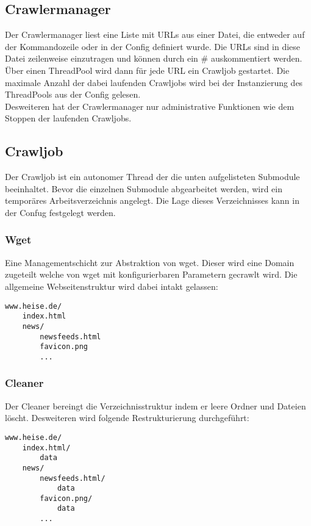 \subsection{Crawlermanager}
\label{sub:crawlermanager}
Der Crawlermanager liest eine Liste mit URLs aus einer Datei, die entweder auf der Kommandozeile oder in
der Config definiert wurde. Die URLs sind in diese Datei zeilenweise einzutragen und können durch ein \# auskommentiert werden.
Über einen ThreadPool wird dann für jede URL ein Crawljob gestartet. Die maximale Anzahl der dabei laufenden Crawljobs wird bei
der Instanzierung des ThreadPools aus der Config gelesen.
\\
Desweiteren hat der Crawlermanager nur administrative Funktionen wie dem Stoppen der laufenden Crawljobs.

\subsection{Crawljob}
\label{sub:crawljob}
Der Crawljob ist ein autonomer Thread der die unten aufgelisteten Submodule beeinhaltet.
Bevor die einzelnen Submodule abgearbeitet werden, wird ein temporäres Arbeitsverzeichnis angelegt.
Die Lage dieses Verzeichnisses kann in der Confug festgelegt werden.

\subsubsection{Wget}
\label{ssub:wget}
Eine Managementschicht zur Abstraktion von wget.
Dieser wird eine Domain zugeteilt welche von wget mit konfigurierbaren Parametern gecrawlt wird.
Die allgemeine Webseitenstruktur wird dabei intakt gelassen:

\begin{verbatim}
www.heise.de/
    index.html
    news/
        newsfeeds.html
        favicon.png
        ...
\end{verbatim}


\subsubsection{Cleaner}
\label{ssub:cleaner}
Der Cleaner bereingt die Verzeichnisstruktur indem er leere Ordner und Dateien löscht.
Desweiteren wird folgende Restrukturierung durchgeführt:
\begin{verbatim}
www.heise.de/ 
    index.html/
        data
    news/
        newsfeeds.html/
            data
        favicon.png/
            data
        ...
\end{verbatim}


